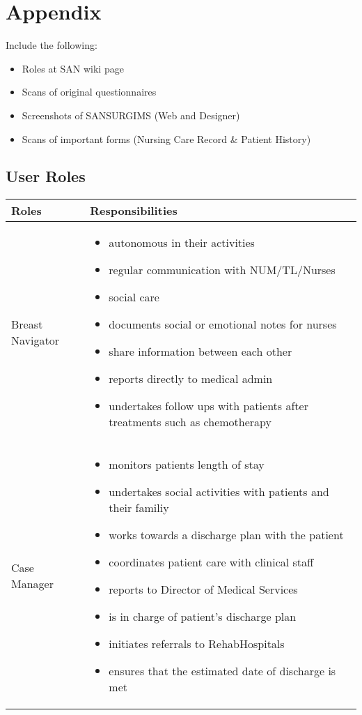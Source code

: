 \section{Appendix}

Include the following:
\begin{itemize}
\item Roles at SAN wiki page
\item Scans of original questionnaires
\item Screenshots of SANSURGIMS (Web and Designer)
\item Scans of important forms (Nursing Care Record \& Patient History)
\end{itemize}

\subsection{User Roles}
\label{User Roles}

\hfil\begin{tabular}{|p{5cm}|p{11cm}|}
\hline
{\hfil\bf Roles} & {\hfil\bf Responsibilities} \\
\hline
Breast Navigator & \vspace{-5mm}\begin{itemize}
\item autonomous in their activities
\item regular communication with NUM/TL/Nurses
\item social care
\item documents social or emotional notes for nurses
\item share information between each other
\item reports directly to medical admin
\item undertakes follow ups with patients after treatments such as chemotherapy
\end{itemize} \\
\hline
Case Manager & \vspace{-5mm}\begin{itemize}
\item monitors patients length of stay
\item undertakes social activities with patients and their familiy
\item works towards a discharge plan with the patient
\item coordinates patient care with clinical staff
\item reports to Director of Medical Services
\item is in charge of patient's discharge plan
\item initiates referrals to Rehab\/Hospitals
\item ensures that the estimated date of discharge is met
\end{itemize} \\
\hline
\end{tabular}

